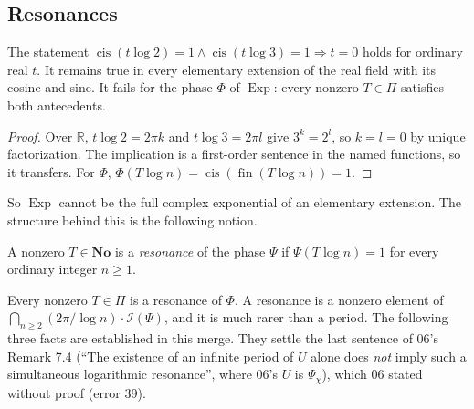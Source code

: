 \documentclass[11pt,a4paper]{article}
\numberwithin{equation}{section}
\theoremstyle{definition}
\theoremstyle{remark}
\newcommand{\No}{\mathbf{No}}
\newcommand{\R}{\mathbb R}
\newcommand{\fin}{\operatorname{fin}}
\newcommand{\cis}{\operatorname{cis}}
\newcommand{\Exp}{\operatorname{Exp}}
\newcommand{\cI}{\mathcal I}
\newcommand{\src}[1]{\textup{[#1]}}
\begin{document}
\subsection{Resonances}\label{gz:sec:resonance}
\begin{proposition}[Two-frequency test \src{06}]\label{gz:prop:twofreq}
The statement
$\cis(t\log2)=1\wedge\cis(t\log3)=1\Rightarrow t=0$ holds for ordinary real
$t$. It remains true in every elementary extension of the real field with
its cosine and sine. It fails for the phase $\Phi$ of $\Exp$: every nonzero
$T\in\Pi$ satisfies both antecedents.
\end{proposition}
\begin{proof}
Over $\R$, $t\log2=2\pi k$ and $t\log3=2\pi l$ give $3^k=2^l$, so $k=l=0$ by
unique factorization. The implication is a first-order sentence in the
named functions, so it transfers. For $\Phi$, $\Phi(T\log n)=\cis(\fin(T\log n))=1$.
\end{proof}
So $\Exp$ cannot be the full complex exponential of an elementary
extension. The structure behind this is the following notion.

\begin{definition}[Resonance]\label{gz:def:resonance}
A nonzero $T\in\No$ is a \emph{resonance} of the phase $\Psi$ if
$\Psi(T\log n)=1$ for every ordinary integer $n\ge1$.
\end{definition}
Every nonzero $T\in\Pi$ is a resonance of $\Phi$. A resonance is a nonzero
element of $\bigcap_{n\ge2}(2\pi/\log n)\cdot\cI(\Psi)$, and it is much
rarer than a period. The following three facts are established in this
merge. They settle the last sentence of 06's Remark 7.4 (``The existence of
an infinite period of $U$ alone does \emph{not} imply such a simultaneous
logarithmic resonance'', where 06's $U$ is $\Psi_\chi$), which 06 stated
without proof (error 39).
\end{document}
